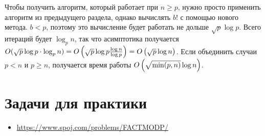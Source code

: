 Чтобы получить алгоритм, который работает при $n \ge p$, нужно просто применить алгоритм из предыдущего раздела, однако вычислять $b!$ с помощью нового метода. $b < p$, поэтому это вычисление будет работать не дольше $\sqrt{p} \log p$. Всего итераций будет $\log_p n$, так что асимптотика получается $O(\sqrt{p} \log p \cdot \log_p n) = O\left(\sqrt{p} \log p \frac{\log n}{\log p}\right) = O\left(\sqrt{p} \log n\right)$. Если объединить случаи $p < n$ и $p \ge n$, получается время работы $O\left(\sqrt{\min (p, n)} \log n\right)$.

\section{Задачи для практики}

\begin{itemize}
    
    \item \href{https://www.spoj.com/problems/FACTMODP/}{https://www.spoj.com/problems/FACTMODP/}
\end{itemize}

